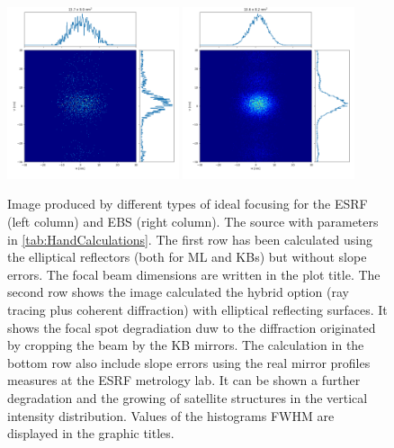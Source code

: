 \documentclass{iucr}              %
\begin{document}
\begin{figure}
\includegraphics[width=0.45\textwidth]{GRAPHICS/hybriderrorsESRF.png}
\includegraphics[width=0.45\textwidth]{GRAPHICS/hybriderrorsEBS.png}
\caption{Image produced by different types of ideal focusing for the ESRF (left column) and EBS (right column). The source with parameters in 
\ref{tab:HandCalculations}. 
The first row has been calculated using the elliptical reflectors (both for ML and KBs) but without slope errors. The focal beam dimensions are written in the plot title.
The second row shows the image calculated the hybrid option (ray tracing plus coherent diffraction) with elliptical reflecting surfaces. It shows the focal spot degradiation duw to the diffraction originated by cropping the beam by the KB mirrors. The calculation in the bottom row also include slope errors using the real mirror profiles measures at the ESRF metrology lab. It can be shown a further degradation and the growing of satellite structures in the vertical intensity distribution. Values of the histograms FWHM are displayed in the graphic titles. 
}
\end{figure}
\end{document}

